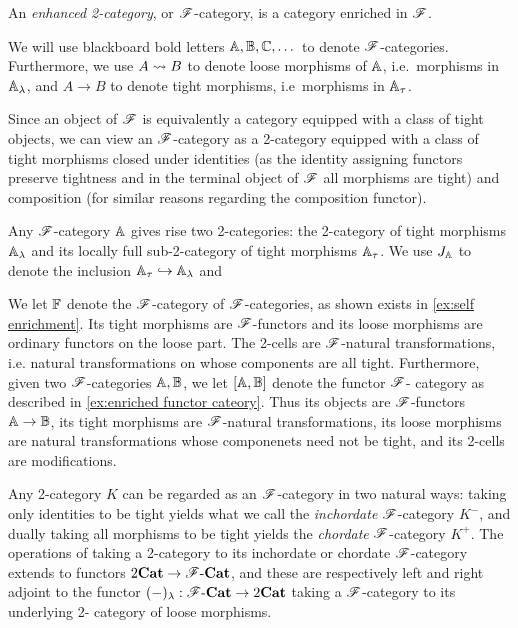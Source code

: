 \documentclass[../thesis.tex]{subfiles}
\begin{document}
\begin{definition}\label{def:F-category}
  An \emph{enhanced 2-category}, or ${\mathscr{F}}$-category, is a category enriched in ${\mathscr{F}}$.
\end{definition}
\begin{notation}
  We will use blackboard bold letters ${\mathbb{A}},{\mathbb{B}},{\mathbb{C}},\dots$ to denote ${\mathscr{F}}$-categories. Furthermore,
  we use $A \rightsquigarrow B$ to denote loose morphisms of ${\mathbb{A}}$, i.e.\ morphisms in ${\mathbb{A}}_\lambda$, and
  $A \to B$ to denote tight morphisms, i.e\ morphisms in ${\mathbb{A}}_\tau$.
\end{notation}
\begin{remark}
  Since an object of ${\mathscr{F}}$ is equivalently a category equipped with a class of tight objects, we
  can  view an ${\mathscr{F}}$-category as a 2-category equipped with a class of tight morphisms closed under
  identities (as the identity assigning functors preserve tightness and in the terminal object of
  ${\mathscr{F}}$ all morphisms are tight) and composition (for similar reasons regarding the composition functor).
\end{remark}

Any ${\mathscr{F}}$-category ${\mathbb{A}}$ gives rise two 2-categories: the 2-category of tight morphisms ${\mathbb{A}}_
\lambda$ and its locally full sub-2-category of tight morphisms ${\mathbb{A}}_\tau$. We use $J_{\mathbb{A}}$ to
denote the inclusion ${\mathbb{A}}_\tau \hookrightarrow {\mathbb{A}}_\lambda$ and

We let ${\mathbb{F}}$ denote the ${\mathscr{F}}$-category of ${\mathscr{F}}$-categories, as shown exists in \cref{ex:self enrichment}.
Its tight morphisms are ${\mathscr{F}}$-functors and its loose morphisms are ordinary functors on the loose part.
The 2-cells are ${\mathscr{F}}$-natural transformations, i.e. natural transformations on whose components are all
tight. Furthermore, given two ${\mathscr{F}}$-categories ${\mathbb{A}},{\mathbb{B}}$, we let $[{\mathbb{A}},{\mathbb{B}}]$ denote the functor ${\mathscr{F}}$-%
category as described in \cref{ex:enriched functor cateory}. Thus its objects are ${\mathscr{F}}$-functors ${\mathbb{A}} \to
{\mathbb{B}}$, its tight morphisms are ${\mathscr{F}}$-natural transformations, its loose morphisms are natural transformations
whose componenets need not be tight, and its 2-cells are modifications.

\begin{definition}
  Any 2-category $K$ can be regarded as an ${\mathscr{F}}$-category in two natural ways: taking only
  identities to be tight yields what we call the \emph{inchordate} ${\mathscr{F}}$-category $K^-$, and 
  dually taking all morphisms to be tight yields the \emph{chordate} ${\mathscr{F}}$-category $K^+$. The
  operations of taking a 2-category to its inchordate or chordate ${\mathscr{F}}$-category extends to
  functors $2{\mathbf{Cat}} \to {\mathscr{F}}\text-{\mathbf{Cat}}$, and these are respectively left and right adjoint to the
  functor $(-)_\lambda : {\mathscr{F}}\text-{\mathbf{Cat}} \to 2{\mathbf{Cat}}$ taking a ${\mathscr{F}}$-category to its underlying 2-%
  category of loose morphisms.
\end{definition}
\end{document}
